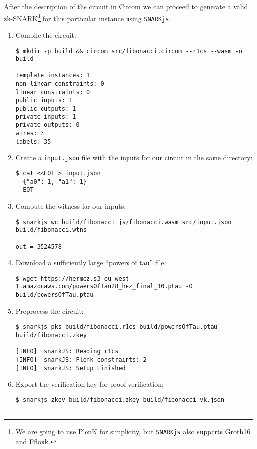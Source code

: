 After the description of the circuit in Circom we can proceed to generate a valid zk-SNARK\footnote{We are going to use PlonK for simplicity, but \texttt{SNARKjs} also supports Groth16 and Fflonk.} for this particular instance using \texttt{SNARKjs}:
\begin{enumerate}
\item Compile the circuit:
\begin{lstlisting}[style=termt]
$ mkdir -p build && circom src/fibonacci.circom --r1cs --wasm -o build

template instances: 1
non-linear constraints: 0
linear constraints: 0
public inputs: 1
public outputs: 1
private inputs: 1
private outputs: 0
wires: 3
labels: 35
\end{lstlisting}

\item Create a \texttt{input.json} file with the inputs for our circuit in the same directory:
\begin{lstlisting}[style=termt]
$ cat <<EOT > input.json
  {"a0": 1, "a1": 1}
  EOT
\end{lstlisting}

\item Compute the witness for our inputs:
\begin{lstlisting}[style=termt]
$ snarkjs wc build/fibonacci_js/fibonacci.wasm src/input.json build/fibonacci.wtns

out = 3524578
\end{lstlisting}

\item Download a sufficiently large ``powers of tau'' file:
\begin{lstlisting}[style=termt]
$ wget https://hermez.s3-eu-west-1.amazonaws.com/powersOfTau28_hez_final_10.ptau -O build/powersOfTau.ptau
\end{lstlisting}

\item Preprocess the circuit:
\begin{lstlisting}[style=termt]
$ snarkjs pks build/fibonacci.r1cs build/powersOfTau.ptau build/fibonacci.zkey

[INFO]  snarkJS: Reading r1cs
[INFO]  snarkJS: Plonk constraints: 2
[INFO]  snarkJS: Setup Finished
\end{lstlisting}

\item Export the verification key for proof verification:
\begin{lstlisting}[style=termt]
$ snarkjs zkev build/fibonacci.zkey build/fibonacci-vk.json


\end{lstlisting}
\end{enumerate}
